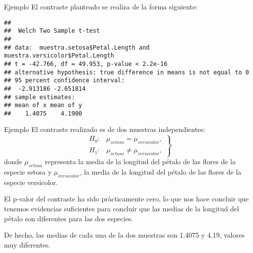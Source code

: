 \documentclass[
  ignorenonframetext,
]{beamer}
\newenvironment{Shaded}{\begin{snugshade}}{\end{snugshade}}
\newcommand{\DataTypeTok}[1]{\textcolor[rgb]{0.13,0.29,0.53}{#1}}
\newcommand{\KeywordTok}[1]{\textcolor[rgb]{0.13,0.29,0.53}{\textbf{#1}}}
\newcommand{\NormalTok}[1]{#1}
\newcommand{\OperatorTok}[1]{\textcolor[rgb]{0.81,0.36,0.00}{\textbf{#1}}}
\newcommand{\StringTok}[1]{\textcolor[rgb]{0.31,0.60,0.02}{#1}}
\begin{document}
\begin{frame}[fragile]{Ejemplo}
\protect\hypertarget{ejemplo-2}{}
El contraste planteado se realiza de la forma siguiente:

\begin{Shaded}
\end{Shaded}

\begin{verbatim}
## 
##  Welch Two Sample t-test
## 
## data:  muestra.setosa$Petal.Length and muestra.versicolor$Petal.Length
## t = -42.766, df = 49.953, p-value < 2.2e-16
## alternative hypothesis: true difference in means is not equal to 0
## 95 percent confidence interval:
##  -2.913186 -2.651814
## sample estimates:
## mean of x mean of y 
##    1.4075    4.1900
\end{verbatim}
\end{frame}

\begin{frame}{Ejemplo}
\protect\hypertarget{ejemplo-3}{}
El contraste realizado es de dos muestras independientes: \[
\left.
\begin{array}{ll}
H_0: & \mu_{{setosa}} =\mu_{{versicolor}}, \\
H_1: & \mu_{{setosa}} \neq \mu_{{versicolor}},
\end{array}
\right\}
\] donde \(\mu_{{setosa}}\) representa la media de la longitud del
pétalo de las flores de la especie setosa y \(\mu_{{versicolor}}\), la
media de la longitud del pétalo de las flores de la especie versicolor.

El p-valor del contraste ha sido pràcticamente cero, lo que nos hace
concluir que tenemos evidencias suficientes para concluir que las medias
de la longitud del pétalo son diferentes para las dos especies.

De hecho, las medias de cada una de la dos muestras son 1.4075 y 4.19,
valores muy diferentes.
\end{frame}
\end{document}
